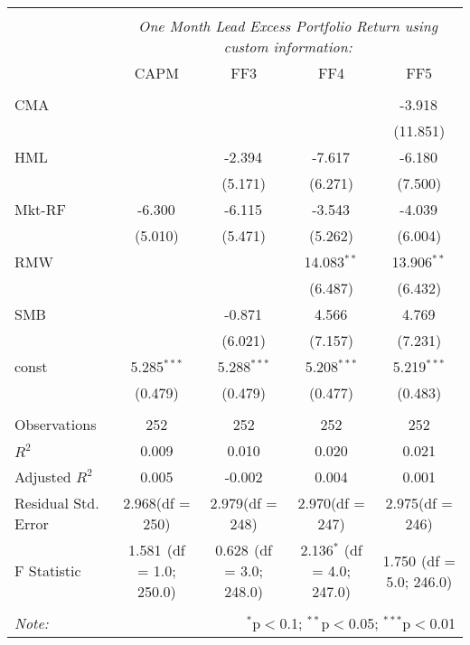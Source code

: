 \begin{table}[!htbp] \centering
\begin{tabular}{@{\extracolsep{5pt}}lcccc}
\\[-1.8ex]\hline
\hline \\[-1.8ex]
& \multicolumn{4}{c}{\textit{One Month Lead Excess Portfolio Return using custom information:}} \
\cr \cline{4-5}
\\[-1.8ex] & CAPM & FF3 & FF4 & FF5 \\
\hline \\[-1.8ex]
 CMA & & & & -3.918$^{}$ \\
  & & & & (11.851) \\
 HML & & -2.394$^{}$ & -7.617$^{}$ & -6.180$^{}$ \\
  & & (5.171) & (6.271) & (7.500) \\
 Mkt-RF & -6.300$^{}$ & -6.115$^{}$ & -3.543$^{}$ & -4.039$^{}$ \\
  & (5.010) & (5.471) & (5.262) & (6.004) \\
 RMW & & & 14.083$^{**}$ & 13.906$^{**}$ \\
  & & & (6.487) & (6.432) \\
 SMB & & -0.871$^{}$ & 4.566$^{}$ & 4.769$^{}$ \\
  & & (6.021) & (7.157) & (7.231) \\
 const & 5.285$^{***}$ & 5.288$^{***}$ & 5.208$^{***}$ & 5.219$^{***}$ \\
  & (0.479) & (0.479) & (0.477) & (0.483) \\
\hline \\[-1.8ex]
 Observations & 252 & 252 & 252 & 252 \\
 $R^2$ & 0.009 & 0.010 & 0.020 & 0.021 \\
 Adjusted $R^2$ & 0.005 & -0.002 & 0.004 & 0.001 \\
 Residual Std. Error & 2.968(df = 250) & 2.979(df = 248) & 2.970(df = 247) & 2.975(df = 246)  \\
 F Statistic & 1.581$^{}$ (df = 1.0; 250.0) & 0.628$^{}$ (df = 3.0; 248.0) & 2.136$^{*}$ (df = 4.0; 247.0) & 1.750$^{}$ (df = 5.0; 246.0) \\
\hline
\hline \\[-1.8ex]
\textit{Note:} & \multicolumn{4}{r}{$^{*}$p$<$0.1; $^{**}$p$<$0.05; $^{***}$p$<$0.01} \\
\end{tabular}
\end{table}
